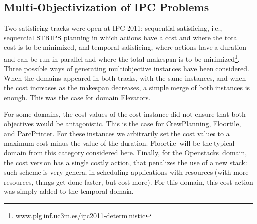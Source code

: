 \documentclass[letterpaper]{article}
\newcommand{\OPENSTACKS}{{\sc Openstacks}}
\newcommand{\ELEVATORS}{{\sc Elevators}}
\newcommand{\CREWPLANNING}{{\sc CrewPlanning}}
\newcommand{\FLOORTILE}{{\sc Floortile}}
\newcommand{\PARCPRINTER}{{\sc ParcPrinter}}
\begin{document}
\subsection{Multi-Objectivization of IPC Problems}
\label{IPCbenchmarks}
Two satisficing tracks were open at IPC-2011: sequential satisficing, i.e., sequential STRIPS planning in which actions have a cost and where the total cost is to be minimized, and temporal satisficing, where actions have a duration and can be run in parallel and where the total makespan is to be minimized\footnote{\url{www.plg.inf.uc3m.es/ipc2011-deterministic}}.
Three possible ways of generating multiobjective instances have been considered. When the domains appeared in both tracks, with the same instances, and when the cost increases as the makespan decreases, a simple merge of both instances is enough. This was the case for domain \ELEVATORS.



For some domains, the cost values of the cost instance did not ensure that both objectives would be antagonistic. This is the case for \CREWPLANNING, \FLOORTILE, and \PARCPRINTER. For these instances we arbitrarily set the cost values to a maximum cost minus the value of the duration. \FLOORTILE\ will be the typical domain from this category considered here.
Finally, for the \OPENSTACKS\ domain, the cost version has a single costly action, that penalizes the use of a new stack: such scheme is very general in scheduling applications with resources (with more resources, things get done faster, but cost more). For this domain, this cost action was simply added to the temporal domain.
\end{document}
